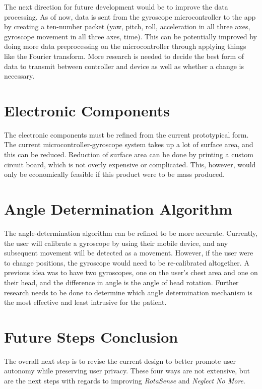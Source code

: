 The next direction for future development would be to improve the data
processing. As of now, data is sent from the gyroscope microcontroller to the
app by creating a ten-number packet (yaw, pitch, roll, acceleration in all
three axes, gyroscope movement in all three axes, time). This can be
potentially improved by doing more data preprocessing on the microcontroller
through applying things like the Fourier transform. More research is needed to
decide the best form of data to transmit between controller and device as well
as whether a change is necessary.

\section{Electronic Components}

The electronic components \textup{must} be refined from the current
prototypical form. The current microcontroller-gyroscope system takes up a lot
of surface area, and this can be reduced. Reduction of surface area can be done
by printing a custom circuit board, which is not overly expensive or
complicated. This, however, would only be economically feasible if this product
were to be mass produced. 

\section{Angle Determination Algorithm}

The angle-determination algorithm can be refined to be more
accurate. Currently, the user will calibrate a gyroscope by using their mobile
device, and any subsequent movement will be detected as a movement. However, if
the user were to change positions, the gyroscope would need to be re-calibrated
altogether. A previous idea was to have two gyroscopes, one on the user’s chest
area and one on their head, and the difference in angle is the angle of head
rotation. Further research needs to be done to determine which angle
determination mechanism is the most effective and least intrusive for the
patient. 

\section{Future Steps Conclusion}

The overall next step is to revise the current design to better promote user
autonomy while preserving user privacy. These four ways are not extensive, but
are the next steps with regards to improving \textit{RotaSense} and
\textit{Neglect No More}.

